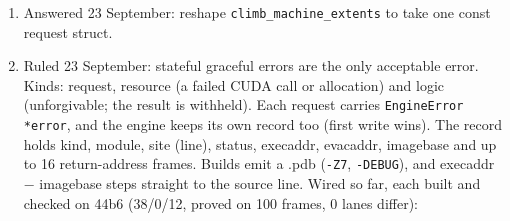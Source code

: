 \begin{enumerate}
\item Answered 23 September: reshape \texttt{climb\_\allowbreak{}machine\_\allowbreak{}extents} to take one const request struct.
\item Ruled 23 September: stateful graceful errors are the only acceptable error. Kinds: request, resource (a failed CUDA call or allocation) and logic (unforgivable; the result is withheld). Each request carries \texttt{Engine\allowbreak{}Error *error}, and the engine keeps its own record too (first write wins). The record holds kind, module, site (line), status, execaddr, evacaddr, imagebase and up to 16 return-address frames. Builds emit a .pdb (\texttt{-\allowbreak{}Z7}, \texttt{-\allowbreak{}DEBUG}), and execaddr − imagebase steps straight to the source line. Wired so far, each built and checked on 44b6 (38/0/12, proved on 100 frames, 0 lanes differ):
\end{enumerate}


